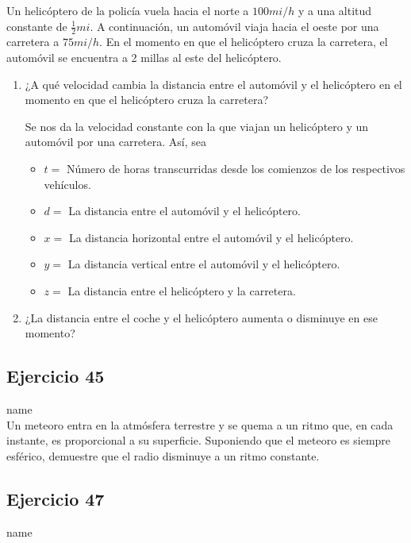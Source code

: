 \documentclass[12pt]{article}
\begin{document}
Un helicóptero de la policía vuela hacia el norte a $100 mi/h$ y a una altitud constante de $\frac{1}{2} mi$. A continuación, un automóvil viaja hacia el oeste por una carretera a $75 mi/h$. En el momento en que el helicóptero cruza la carretera, el automóvil se encuentra a 2 millas al este del helicóptero.
\begin{enumerate}
\item ¿A qué velocidad cambia la distancia entre el automóvil y el helicóptero en el momento en que el helicóptero cruza la carretera?

Se nos da la velocidad constante con la que viajan un helicóptero y un automóvil por una carretera. Así, sea
\begin{itemize}
\item $t=$ Número de horas transcurridas desde los comienzos de los respectivos vehículos.
\item $d=$ La distancia entre el automóvil y el helicóptero.
\item $x=$ La distancia horizontal entre el automóvil y el helicóptero.
\item $y=$ La distancia vertical entre el automóvil y el helicóptero.
\item $z=$ La distancia entre el helicóptero y la carretera.
\end{itemize}

\item ¿La distancia entre el coche y el helicóptero aumenta o disminuye en ese momento?
\end{enumerate}

\subsection{Ejercicio 45} name \\

Un meteoro entra en la atmósfera terrestre y se quema a un ritmo que, en cada instante, es proporcional a su superficie. Suponiendo que el meteoro es siempre esférico, demuestre que el radio disminuye a un ritmo constante.

\subsection{Ejercicio 47} name \\
\end{document}
